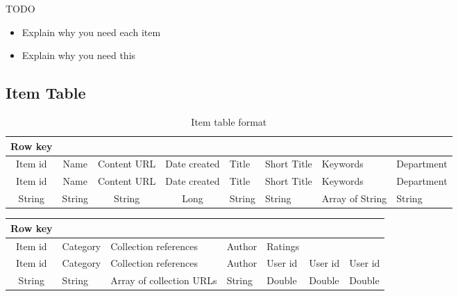 TODO
\begin{itemize}
	\item Explain why you need each item
	\item Explain why you need this		
\end{itemize}

\subsection{Item Table}
\label{sec:item-table}

\begin{table}[h]
\centering
\caption{Item table format}
\label{item-table-format}
\begin{tabular}{@{}|c|cccllll@{}}
\cmidrule(r){1-1}
Row key &  &  &  &  &  &  &  \\ \midrule
Item id & \multicolumn{1}{c|}{Name} & \multicolumn{1}{c|}{Content URL} & \multicolumn{1}{c|}{Date created} & \multicolumn{1}{l|}{Title} & \multicolumn{1}{l|}{Short Title} & \multicolumn{1}{l|}{Keywords} & \multicolumn{1}{l|}{Department} \\ \midrule
Item id & \multicolumn{1}{c|}{Name} & \multicolumn{1}{c|}{Content URL} & \multicolumn{1}{c|}{Date created} & \multicolumn{1}{l|}{Title} & \multicolumn{1}{l|}{Short Title} & \multicolumn{1}{l|}{Keywords} & \multicolumn{1}{l|}{Department} \\ \midrule
String & \multicolumn{1}{c|}{String} & \multicolumn{1}{c|}{String} & \multicolumn{1}{c|}{Long} & \multicolumn{1}{l|}{String} & \multicolumn{1}{l|}{String} & \multicolumn{1}{l|}{Array of String} & \multicolumn{1}{l|}{String} \\ \bottomrule
\end{tabular}
\end{table}

\begin{table}[h]
\centering
\label{item-tabel-format-two}
\begin{tabular}{@{}|c|llllll@{}}
\cmidrule(r){1-1}
Row key &  &  &  &  &  &  \\ \midrule
Item id & \multicolumn{1}{l|}{Category} & \multicolumn{1}{l|}{Collection references} & \multicolumn{1}{l|}{Author} & \multicolumn{1}{l|}{Ratings} & \multicolumn{1}{l|}{} & \multicolumn{1}{l|}{} \\ \midrule
Item id & \multicolumn{1}{l|}{Category} & \multicolumn{1}{l|}{Collection references} & \multicolumn{1}{l|}{Author} & \multicolumn{1}{l|}{User id} & \multicolumn{1}{l|}{User id} & \multicolumn{1}{l|}{User id} \\ \midrule
String & \multicolumn{1}{l|}{String} & \multicolumn{1}{l|}{Array of collection URLs} & \multicolumn{1}{l|}{String} & \multicolumn{1}{l|}{Double} & \multicolumn{1}{l|}{Double} & \multicolumn{1}{l|}{Double} \\ \bottomrule
\end{tabular}
\end{table}

